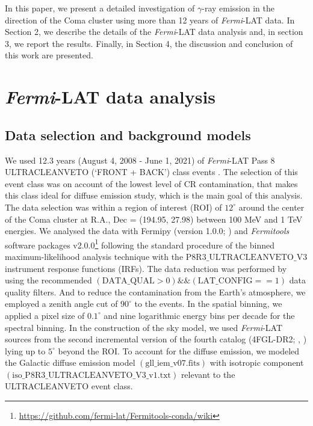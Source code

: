 \documentclass[fleqn,usenatbib]{mnras}
\begin{document}
In this paper, we present a detailed investigation of $\gamma$-ray emission in the direction of the Coma cluster using more than 12 years of \textit{Fermi}-LAT data. In Section 2, we describe the details of the \textit{Fermi}-LAT data analysis and, in section 3, we report the results. Finally, in Section 4, the discussion and conclusion of this work are presented.

\section{\textit{Fermi}-LAT data analysis}

\subsection{Data selection and background models}

We used 12.3 years (August 4, 2008 - June 1, 2021) of \textit{Fermi}-LAT Pass 8 ULTRACLEANVETO (`FRONT + BACK') class events \citep{atwood2013pass}. The selection of this event class was on account of the lowest level of CR contamination, that makes this class ideal for diffuse emission study, which is the main goal of this analysis. The data selection was within a region of interest (ROI) of $\mathrm{12^{\circ}}$ around the center of the Coma cluster at R.A., Dec = (194.95, 27.98) between 100 MeV and 1 TeV energies. We analysed the data with Fermipy (version 1.0.0; \citealt{2017ICRC...35..824W}) and \textit{Fermitools} software packages v2.0.0\footnote{\url{https://github.com/fermi-lat/Fermitools-conda/wiki}} following the standard procedure of the binned maximum-likelihood analysis technique with the $\mathrm{P8R3\_ULTRACLEANVETO\_V3}$ instrument response functions (IRFs). The data reduction was performed by using the recommended $\mathrm{(DATA\_QUAL>0)\&\&(LAT\_CONFIG==1)}$ data quality filters. And to reduce the contamination from the Earth's atmosphere, we employed a zenith angle cut of $\mathrm{90^{\circ}}$ to the events.
 In the spatial binning, we applied a pixel size of $\mathrm{0.1^{\circ}}$ and nine logarithmic energy bins per decade for the spectral binning. In the construction of the sky model, we used \textit{Fermi}-LAT sources from the second incremental version of the fourth catalog (4FGL-DR2; \citealt{2020arXiv200511208B}, \citealt{2020ApJS..247...33A}) lying up to $\mathrm{5^{\circ}}$ beyond the ROI. To account for the diffuse emission, we modeled the Galactic diffuse emission model $\mathrm{(gll{\_}iem{\_}v07.fits)}$ with isotropic component $\mathrm{(iso{\_}P8R3{\_}ULTRACLEANVETO{\_}V3{\_}v1.txt)}$ relevant to the ULTRACLEANVETO event class.
\end{document}
